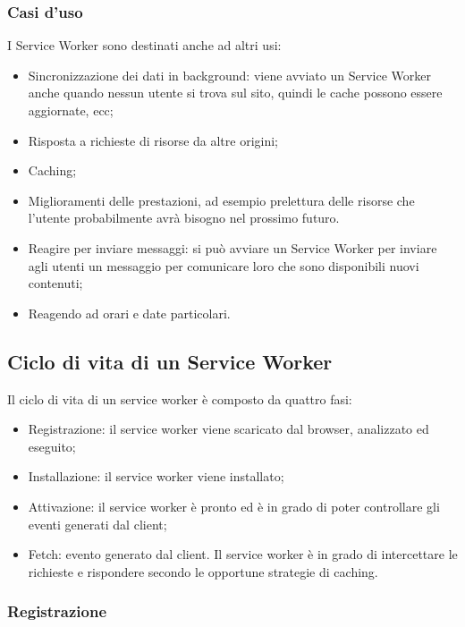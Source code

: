 \documentclass[11pt ,a4paper , twoside , openright ]{article}
\begin{document}
\subsubsection{Casi d'uso}
I Service Worker sono destinati anche ad altri usi:
\begin{itemize}
	\item Sincronizzazione dei dati in background: viene avviato un Service Worker anche quando nessun utente si trova sul sito, quindi le cache possono essere aggiornate, ecc;
	\item Risposta a richieste di risorse da altre origini;
	\item Caching;
	\item Miglioramenti delle prestazioni, ad esempio prelettura delle risorse che l'utente probabilmente avrà bisogno nel prossimo futuro.
	\item Reagire per inviare messaggi: si può avviare un Service Worker per inviare agli utenti un messaggio per comunicare loro che sono disponibili nuovi contenuti;
	\item Reagendo ad orari e date particolari.
\end{itemize}

\subsection{Ciclo di vita di un Service Worker}
Il ciclo di vita di un service worker è composto da quattro fasi:
\begin{itemize}
	\item Registrazione: il service worker viene scaricato dal browser, analizzato ed eseguito;
	\item Installazione: il service worker viene installato;
	\item Attivazione: il service worker è pronto ed è in grado di poter controllare gli eventi generati dal client;
	\item Fetch: evento generato dal client. Il service worker è in grado di intercettare le richieste e rispondere secondo le opportune strategie di caching. 
\end{itemize}

\subsubsection{Registrazione}
\end{document}

